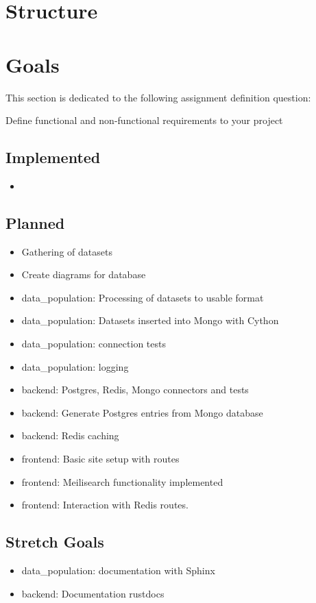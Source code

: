 \documentclass[a4paper, 12pt]{article}
\begin{document}
\section{Structure}


\section{Goals}
This section is dedicated to the following assignment definition question:

Define functional and non-functional requirements to your project

\subsection{Implemented}
\begin{itemize}
	\item
\end{itemize}

\subsection{Planned}
\begin{itemize}
	\item Gathering of datasets
	\item Create diagrams for database
	\item data\_population: Processing of datasets to usable format
	\item data\_population: Datasets inserted into Mongo with Cython
	\item data\_population: connection tests
	\item data\_population: logging
	\item backend: Postgres, Redis, Mongo connectors and tests
	\item backend: Generate Postgres entries from Mongo database
	\item backend: Redis caching
	\item frontend: Basic site setup with routes
	\item frontend: Meilisearch functionality implemented
	\item frontend: Interaction with Redis routes.
\end{itemize}

\subsection{Stretch Goals}
\begin{itemize}
	\item data\_population: documentation with Sphinx
	\item backend: Documentation rustdocs 
	
\end{itemize}
\end{document}

